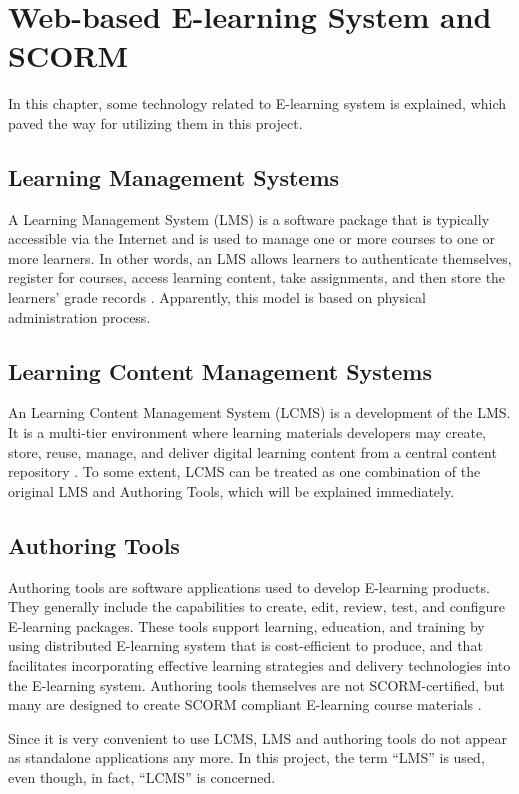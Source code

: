 \chapter{Web-based E-learning System and SCORM}
\thispagestyle{empty}
In this chapter, some technology related to E-learning system is explained, which paved the way for utilizing them in this project.
\section{Learning Management Systems}
A Learning Management System (LMS) is a software package that is typically accessible via the Internet and is used to manage one or more courses to 
one or more learners. In other words, an LMS allows learners to authenticate themselves, register for courses, access learning content, take 
assignments, and then store the learners’ grade records \cite{lms}. Apparently, this model is based on physical administration process.
\section{Learning Content Management Systems}
An Learning Content Management System (LCMS) is a development of the LMS. It is a multi-tier environment where learning materials developers may 
create, store, reuse, manage, and deliver digital learning content from a central content repository \cite{lcms}. To some extent, LCMS can be treated 
as one combination of the original LMS and Authoring Tools, which will be explained immediately.
\section{Authoring Tools}
Authoring tools are software applications used to develop E-learning products. They generally include the capabilities to create, edit, review, test, 
and configure E-learning packages. These tools support learning, education, and training by using distributed E-learning system that is 
cost-efficient to produce, and that facilitates incorporating effective learning strategies and delivery technologies into the E-learning system. 
Authoring tools themselves are not SCORM-certified, but many are designed to create SCORM compliant E-learning course materials \cite{at}.

Since it is very convenient to use LCMS, LMS and authoring tools do not appear as standalone applications any more. In this project, the term ``LMS'' 
is used, even though, in fact, ``LCMS'' is concerned.
